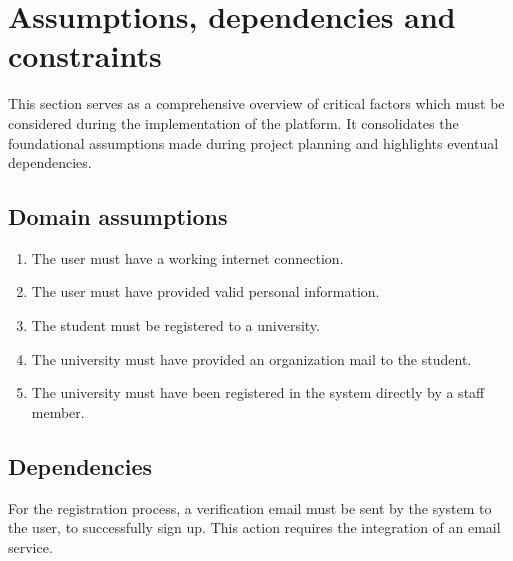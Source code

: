 \section{Assumptions, dependencies and constraints}

This section serves as a comprehensive overview of critical factors which must be considered during the implementation of the platform.
It consolidates the foundational assumptions made during project planning and highlights eventual dependencies.

\subsection{Domain assumptions}

\begin{enumerate}[label=\textbf{D\arabic* -}]
    \item The user must have a working internet connection.
    \item The user must have provided valid personal information.
    \item The student must be registered to a university.
    \item The university must have provided an organization mail to the student.
    \item The university must have been registered in the system directly by a staff member.
\end{enumerate}

\subsection{Dependencies}

For the registration process, a verification email must be sent by the system to the user, to successfully
sign up.
This action requires the integration of an email service.

